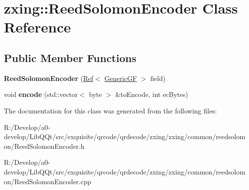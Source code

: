 \hypertarget{classzxing_1_1_reed_solomon_encoder}{}\section{zxing\+:\+:Reed\+Solomon\+Encoder Class Reference}
\label{classzxing_1_1_reed_solomon_encoder}
\subsection*{Public Member Functions}
\begin{DoxyCompactItemize}
\item 
\mbox{\label{classzxing_1_1_reed_solomon_encoder_a179d50992776432001991dd106a1a731}} 
{\bfseries Reed\+Solomon\+Encoder} (\mbox{\hyperlink{classzxing_1_1_ref}{Ref}}$<$ \mbox{\hyperlink{classzxing_1_1_generic_g_f}{Generic\+GF}} $>$ field)
\item 
\mbox{\label{classzxing_1_1_reed_solomon_encoder_a00cd06f2fb555c99c2749c249302e944}} 
void {\bfseries encode} (std\+::vector$<$ byte $>$ \&to\+Encode, int ec\+Bytes)
\end{DoxyCompactItemize}


The documentation for this class was generated from the following files\+:\begin{DoxyCompactItemize}
\item 
R\+:/\+Develop/a0-\/develop/\+Lib\+Q\+Qt/src/exquisite/qrcode/qrdecode/zxing/zxing/common/reedsolomon/Reed\+Solomon\+Encoder.\+h\item 
R\+:/\+Develop/a0-\/develop/\+Lib\+Q\+Qt/src/exquisite/qrcode/qrdecode/zxing/zxing/common/reedsolomon/Reed\+Solomon\+Encoder.\+cpp\end{DoxyCompactItemize}
